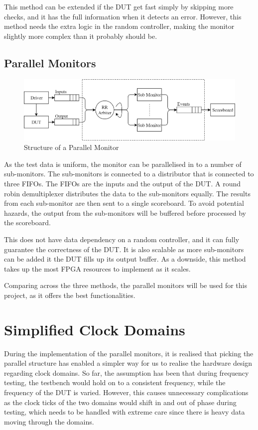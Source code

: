 This method can be extended if the DUT get fast simply by skipping more checks, and it has the full information when it detects an error.
However, this method needs the extra logic in the random controller, making the monitor slightly more complex than it probably should be.

\subsection{Parallel Monitors}

\begin{figure}[H]
  \centering
  \includegraphics[width=15cm]{img/ParMon}
  \caption{Structure of a Parallel Monitor}
  \label{ParMon}
\end{figure}

As the test data is uniform, the monitor can be parallelised in to a number of sub-monitors.
The sub-monitors is connected to a distributor that is connected to three FIFOs.
The FIFOs are the inputs and the output of the DUT.
A round robin demultiplexer distributes the data to the sub-monitors equally.
The results from each sub-monitor are then sent to a single scoreboard.
To avoid potential hazards, the output from the sub-monitors will be buffered before processed by the scoreboard.

This does not have data dependency on a random controller, and it can fully guarantee the correctness of the DUT.
It is also scalable as more sub-monitors can be added it the DUT fills up its output buffer.
As a downside, this method takes up the most FPGA resources to implement as it scales.

Comparing across the three methods, the parallel monitors will be used for this project, as it offers the best functionalities.

\section{Simplified Clock Domains}
During the implementation of the parallel monitors, it is realised that picking the parallel structure has enabled a simpler way for us to realise the hardware design regarding clock domains.
So far, the assumption has been that during frequency testing, the testbench would hold on to a consistent frequency, while the frequency of the DUT is varied.
However, this causes unnecessary complications as the clock ticks of the two domains would shift in and out of phase during testing, which needs to be handled with extreme care since there is heavy data moving through the domains.

